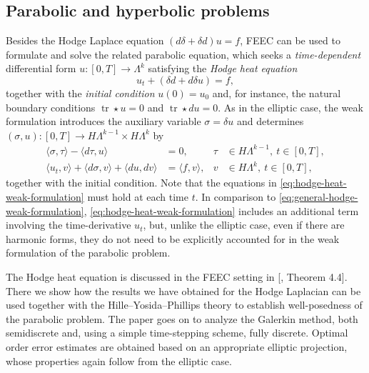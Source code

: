 \subsection{{Parabolic and hyperbolic problems}}\label{sec:parabolic-hyperbolic}

{Besides the Hodge Laplace equation $(d\delta+\delta d)u=f$, FEEC can be used to formulate and solve the related parabolic equation, which seeks a \emph{time-dependent} differential form $u:[0,T]\to\Lambda^k$ satisfying the \emph{Hodge heat equation}}
\begin{equation}\label{eq:hodge-heat-equation}
u_t+(\delta d+d\delta u)=f,
\end{equation}
{together with the \emph{initial condition} $u(0)=u_0$ and, for instance, the natural boundary conditions $\operatorname{tr}\star u=0$ and $\operatorname{tr}\star du=0$. As in the elliptic case, the weak formulation introduces the auxiliary variable $\sigma=\delta u$ and determines $(\sigma,u):[0,T]\to H\Lambda^{k-1}\times H\Lambda^k$ by}
\begin{equation}\label{eq:hodge-heat-weak-formulation}
\begin{aligned}
\langle\sigma,\tau\rangle-\langle d\tau,u\rangle&=0,&\tau&\in H\Lambda^{k-1},\ t\in[0,T],\\
\langle u_t,v\rangle+\langle d\sigma,v\rangle+\langle du,dv\rangle&=\langle f,v\rangle,&v&\in H\Lambda^k,\ t\in[0,T],
\end{aligned}
\end{equation}
{together with the initial condition. Note that the equations in \eqref{eq:hodge-heat-weak-formulation} must hold at each time $t$. In comparison to \eqref{eq:general-hodge-weak-formulation}, \eqref{eq:hodge-heat-weak-formulation} includes an additional term involving the time-derivative $u_t$, but, unlike the elliptic case, even if there are harmonic forms, they do not need to be explicitly accounted for in the weak formulation of the parabolic problem.}

{The Hodge heat equation is discussed in the FEEC setting in [, Theorem 4.4]. There we show how the results we have obtained for the Hodge Laplacian can be used together with the Hille–Yosida–Phillips theory to establish well-posedness of the parabolic problem. The paper goes on to analyze the Galerkin method, both semidiscrete and, using a simple time-stepping scheme, fully discrete. Optimal order error estimates are obtained based on an appropriate elliptic projection, whose properties again follow from the elliptic case.}


